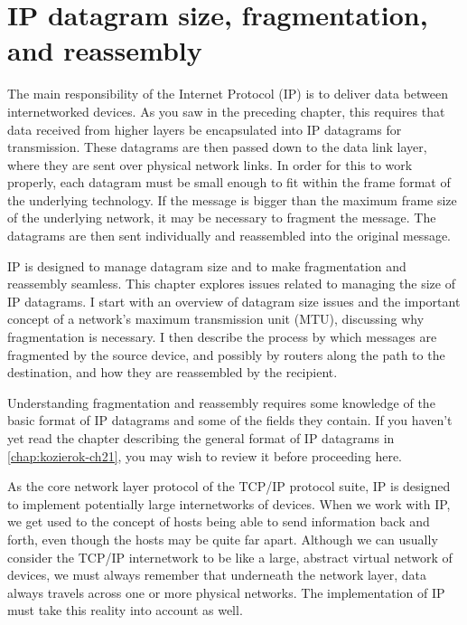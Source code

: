 \chapter{IP datagram size, fragmentation, and reassembly}
\label{chap:kozierok-ch22}


The main responsibility of the Internet Protocol (IP) is to deliver data
between internetworked devices. As you saw in the preceding chapter,
this requires that data received from higher layers be encapsulated into
IP datagrams for transmission. These datagrams are then passed down to
the data link layer, where they are sent over physical network links. In
order for this to work properly, each datagram must be small enough to
fit within the frame format of the underlying technology. If the message
is bigger than the maximum frame size of the underlying network, it may
be necessary to fragment the message. The datagrams are then sent
individually and reassembled into the original message.

IP is designed to manage datagram size and to make fragmentation and
reassembly seamless. This chapter explores issues related to managing
the size of IP datagrams. I start with an overview of datagram size
issues and the important concept of a network's maximum transmission
unit (MTU), discussing why fragmentation is necessary. I then describe
the process by which messages are fragmented by the source device, and
possibly by routers along the path to the destination, and how they are
reassembled by the recipient.


\begin{backgroundinfo}
Understanding fragmentation and reassembly requires some knowledge of the basic format of IP datagrams and some of the fields they contain.
If you haven't yet read the chapter describing the general format of IP datagrams in \cref{chap:kozierok-ch21}, you may wish to review it before proceeding here.
\end{backgroundinfo}

As the core network layer protocol of the TCP/IP protocol suite, IP is designed to implement potentially large internetworks of devices.
When we work with IP, we get used to the concept of hosts being able to send information
back and forth, even though the hosts may be quite far apart. Although
we can usually consider the TCP/IP internetwork to be like a large,
abstract virtual network of devices, we must always remember that
underneath the network layer, data always travels across one or more
physical networks. The implementation of IP must take this reality into account as well.

